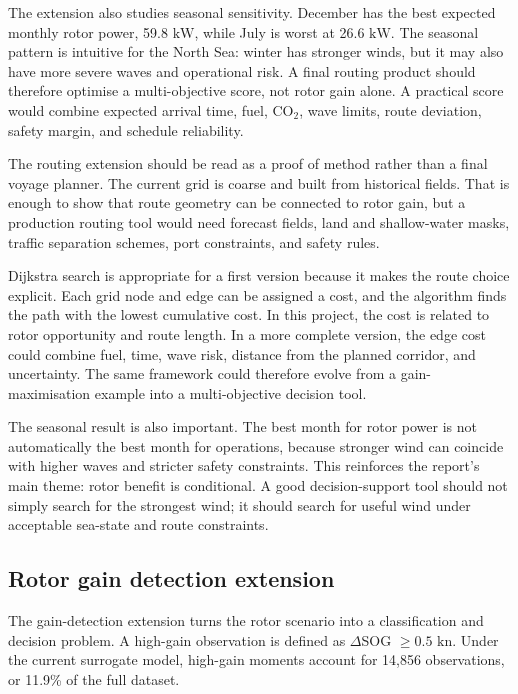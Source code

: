 \documentclass[10pt,a4paper]{article}
\newcommand{\kn}{\ensuremath{\mathrm{kn}}}
\newcommand{\kw}{\ensuremath{\mathrm{kW}}}
\newcommand{\co}{CO$_2$}
\newcommand{\sog}{SOG}
\begin{document}
The extension also studies seasonal sensitivity. December has the best expected
monthly rotor power, 59.8 \kw{}, while July is worst at 26.6 \kw{}. The seasonal
pattern is intuitive for the North Sea: winter has stronger winds, but it may
also have more severe waves and operational risk. A final routing product should
therefore optimise a multi-objective score, not rotor gain alone. A practical
score would combine expected arrival time, fuel, \co{}, wave limits, route
deviation, safety margin, and schedule reliability.

The routing extension should be read as a proof of method rather than a final
voyage planner. The current grid is coarse and built from historical fields.
That is enough to show that route geometry can be connected to rotor gain, but a
production routing tool would need forecast fields, land and shallow-water
masks, traffic separation schemes, port constraints, and safety rules.

Dijkstra search is appropriate for a first version because it makes the route
choice explicit. Each grid node and edge can be assigned a cost, and the
algorithm finds the path with the lowest cumulative cost. In this project, the
cost is related to rotor opportunity and route length. In a more complete
version, the edge cost could combine fuel, time, wave risk, distance from the
planned corridor, and uncertainty. The same framework could therefore evolve
from a gain-maximisation example into a multi-objective decision tool.

The seasonal result is also important. The best month for rotor power is not
automatically the best month for operations, because stronger wind can coincide
with higher waves and stricter safety constraints. This reinforces the report's
main theme: rotor benefit is conditional. A good decision-support tool should
not simply search for the strongest wind; it should search for useful wind under
acceptable sea-state and route constraints.

\subsection{Rotor gain detection extension}

The gain-detection extension turns the rotor scenario into a classification and
decision problem. A high-gain observation is defined as
$\Delta$\sog{} $\geq 0.5$ \kn{}. Under the current surrogate model, high-gain
moments account for 14,856 observations, or 11.9\% of the full dataset.
\end{document}
